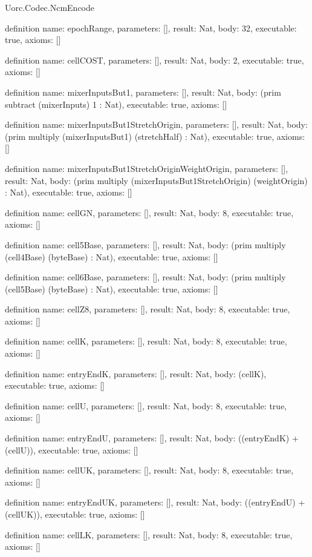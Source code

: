 \begin{lexlean}{Uorc.Codec.NcmEncode}
\begin{semanticmodule}
definition{
  name: epochRange,
  parameters: [],
  result: Nat,
  body: 32,
  executable: true,
  axioms: []
}

definition{
  name: cellCOST,
  parameters: [],
  result: Nat,
  body: 2,
  executable: true,
  axioms: []
}

definition{
  name: mixerInputsBut1,
  parameters: [],
  result: Nat,
  body: (prim subtract (mixerInputs) 1 : Nat),
  executable: true,
  axioms: []
}

definition{
  name: mixerInputsBut1StretchOrigin,
  parameters: [],
  result: Nat,
  body: (prim multiply (mixerInputsBut1) (stretchHalf) : Nat),
  executable: true,
  axioms: []
}

definition{
  name: mixerInputsBut1StretchOriginWeightOrigin,
  parameters: [],
  result: Nat,
  body: (prim multiply (mixerInputsBut1StretchOrigin) (weightOrigin) : Nat),
  executable: true,
  axioms: []
}

definition{
  name: cellGN,
  parameters: [],
  result: Nat,
  body: 8,
  executable: true,
  axioms: []
}

definition{
  name: cell5Base,
  parameters: [],
  result: Nat,
  body: (prim multiply (cell4Base) (byteBase) : Nat),
  executable: true,
  axioms: []
}

definition{
  name: cell6Base,
  parameters: [],
  result: Nat,
  body: (prim multiply (cell5Base) (byteBase) : Nat),
  executable: true,
  axioms: []
}

definition{
  name: cellZ8,
  parameters: [],
  result: Nat,
  body: 8,
  executable: true,
  axioms: []
}

definition{
  name: cellK,
  parameters: [],
  result: Nat,
  body: 8,
  executable: true,
  axioms: []
}

definition{
  name: entryEndK,
  parameters: [],
  result: Nat,
  body: (cellK),
  executable: true,
  axioms: []
}

definition{
  name: cellU,
  parameters: [],
  result: Nat,
  body: 8,
  executable: true,
  axioms: []
}

definition{
  name: entryEndU,
  parameters: [],
  result: Nat,
  body: ((entryEndK) + (cellU)),
  executable: true,
  axioms: []
}

definition{
  name: cellUK,
  parameters: [],
  result: Nat,
  body: 8,
  executable: true,
  axioms: []
}

definition{
  name: entryEndUK,
  parameters: [],
  result: Nat,
  body: ((entryEndU) + (cellUK)),
  executable: true,
  axioms: []
}

definition{
  name: cellLK,
  parameters: [],
  result: Nat,
  body: 8,
  executable: true,
  axioms: []
}


\end{semanticmodule}
\end{lexlean}
